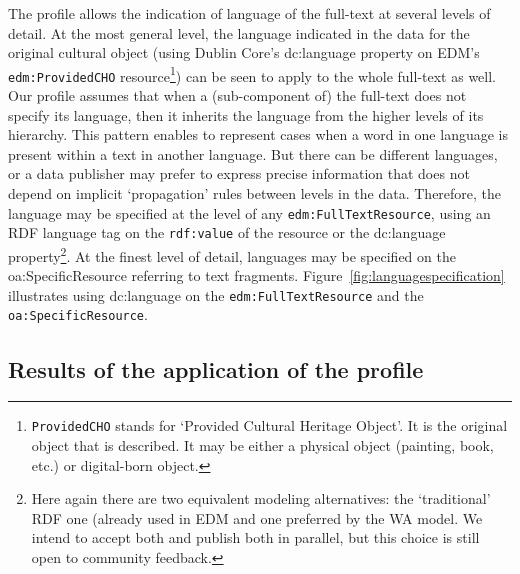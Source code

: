 \documentclass[a4paper,UKenglish,cleveref, autoref]{oasics-v2019}
\begin{document}
The profile allows the indication of language of the full-text at several levels of detail. At the most general level, the language indicated in the data for the original cultural object (using Dublin Core's dc:language property on EDM's \verb+edm:ProvidedCHO+
resource\footnote{\verb+ProvidedCHO+ stands for `Provided Cultural Heritage Object'. It is the original object that is described. It may be either a physical object (painting, book, etc.) or digital-born object.})
can be seen to apply to the whole full-text as well. Our profile assumes that when a (sub-component of) the full-text does not specify its language, then it inherits the language from the higher levels of its hierarchy. This pattern enables to represent cases when a word in one language is present within a text in another language. But there can be different languages, or a data publisher may prefer to express precise information that does not depend on implicit `propagation' rules between levels in the data. Therefore, the language may be specified at the level of any \verb+edm:FullTextResource+, using an RDF language tag on the \verb+rdf:value+ of the resource or the dc:language property\footnote{Here again there are two equivalent modeling alternatives: the `traditional’ RDF one (already used in EDM and one preferred by the WA model. We intend to accept both and publish both in parallel, but this choice is still open to community feedback.}.
At the finest level of detail, languages may be specified on the oa:SpecificResource referring to text fragments. Figure~\ref{fig:languagespecification} illustrates using dc:language on the \verb+edm:FullTextResource+ and the \verb+oa:SpecificResource+.


\subsection{Results of the application of the profile}
\end{document}
